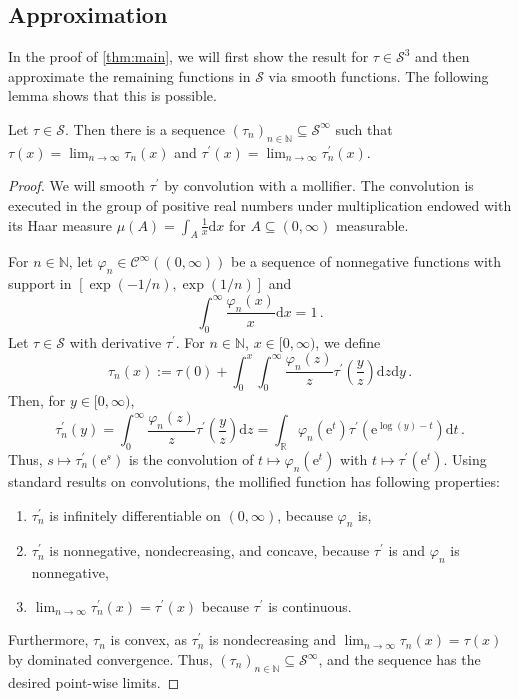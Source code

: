 \documentclass{article}
\renewcommand{\subset}{\subseteq}
\newcommand{\lb}{\left(} %
\newcommand{\rb}{\right)} %
\newcommand{\br}[1]{\lb #1 \rb} %
\newcommand{\brOf}[1]{\!\br{#1}} %
\newcommand*{\mc}[1]{\mathcal{#1}}
\newcommand{\N}{\mathbb{N}}
\newcommand{\R}{\mathbb{R}}
\newcommand{\Rp}{[0, \infty)} %
\newcommand{\Rpp}{(0, \infty)} %
\newcommand{\pr}{^\prime}
\newcommand{\dl}{\mathrm{d}}
\newcommand{\equationFullstop}{\, .}
\newcommand{\eqfs}{\equationFullstop}
\newcommand{\euler}{\mathrm{e}}
\newcommand{\tran}{\tau}
\newcommand{\dtran}{\tran\pr}
\newcommand{\setcc}{\mc S}
\newcommand{\setd}[1]{\mc C^{#1}}
\newcommand{\setccd}[1]{\mc S^{#1}}
\begin{document}
\subsection{Approximation}
%
In the proof of \cref{thm:main}, we will first show the result for $\tran\in\setccd{3}$ and then approximate the remaining functions in $\setcc$ via smooth functions. The following lemma shows that this is possible.
%
\begin{lemma}\label{lmm:cc:molli}
	Let $\tran\in\setcc$. Then there is a sequence $(\tran_n)_{n\in\N}\subset \setccd{\infty}$ such that $\tran(x) =\lim_{n\to\infty}\tran_n(x)$ and $\dtran(x) =\lim_{n\to\infty}\dtran_n(x)$.
\end{lemma}
%
\begin{proof}
	We will smooth $\dtran$ by convolution with a mollifier. The convolution is executed in the group of positive real numbers under multiplication endowed with its Haar measure $\mu(A) = \int_A \frac1x \dl x$ for $A\subset\Rpp$ measurable.
	
	For $n\in\N$, let $\varphi_n\in\setd\infty(\Rpp)$ be a sequence of nonnegative functions with support in $[\exp(-1/n), \exp(1/n)]$ and 
	\begin{equation}
		\int_0^\infty \frac{\varphi_n(x)} x \dl x = 1\eqfs
	\end{equation}
	Let $\tran\in\setcc$ with derivative $\dtran$. 
	For $n\in\N$, $x\in\Rp$, we define
	\begin{equation}
		\tran_n(x) := \tran(0) + \int_{0}^x \int_{0}^\infty \frac{\varphi_n(z)}{z} \dtran\brOf{\frac yz}  \dl z \dl y
		\eqfs
	\end{equation}
	Then, for $y\in\Rp$,
	\begin{equation}
		\dtran_n(y) = \int_{0}^\infty \frac{\varphi_n(z)}{z} \dtran\brOf{\frac yz}  \dl z = \int_{\R} \varphi_n(\euler^t) \dtran\brOf{\euler^{\log(y) - t}}  \dl t
		\eqfs
	\end{equation}
	Thus, $s\mapsto \dtran_n(\euler^s)$ is the convolution of $t\mapsto \varphi_n(\euler^t)$ with $t\mapsto\dtran\brOf{\euler^t}$. Using standard results on convolutions, the mollified function has following properties: 
	\begin{enumerate}[label=(\roman*)]
		\item $\dtran_n$ is infinitely differentiable on $\Rpp$, because $\varphi_n$ is,
		\item $\dtran_n$ is nonnegative, nondecreasing, and concave, because $\dtran$ is and $\varphi_n$ is nonnegative,
		\item $\lim_{n\to\infty}\dtran_n(x) = \dtran(x)$ because $\dtran$ is continuous.
	\end{enumerate}
	Furthermore, $\tran_n$ is convex, as $\dtran_n$ is nondecreasing and $\lim_{n\to\infty}\tran_n(x) = \tran(x)$ by dominated convergence.
	Thus, $(\tran_n)_{n\in\N} \subset \setccd{\infty}$, and the sequence has the desired point-wise limits.
\end{proof}
%
%
%
\end{document}
